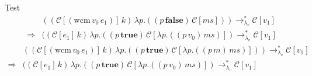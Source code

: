 \documentclass[ms,electronic,twosidetoc,letterpaper,chaptercenter,parttop]{byumsphd}
\begin{document}
\begin{theorem}

















\end{theorem}
\begin{theorem}
Test
\begin{align*}
            &((\mathcal{C}[(\mathrm{wcm}\,v_0\,e_1)]\,k)\,\lambda p.((p\,\mathbf{false})\,\mathcal{C}[\mathit{ms}]))\rightarrow_{\lambda_{v}}^{*}\mathcal{C}[v_1]\\
\Rightarrow &((\mathcal{C}[e_1]\,k)\,\lambda p.((p\,\mathbf{true})\,\mathcal{C}[\lambda p.((p\,v_0)\,\mathit{ms})])\rightarrow_{\lambda_{v}}^{*}\mathcal{C}[v_1]
\end{align*}
\begin{align*}
            &((\mathcal{C}[(\mathrm{wcm}\,v_0\,e_1)]\,k)\,\lambda p.((p\,\mathbf{true})\,\mathcal{C}[\lambda p.((p\,m)\,\mathit{ms})]))\rightarrow_{\lambda_{v}}^{*}\mathcal{C}[v_1]\\
\Rightarrow &((\mathcal{C}[e_1]\,k)\,\lambda p.((p\,\mathbf{true})\,\mathcal{C}[\lambda p.((p\,v_0)\,\mathit{ms})])\rightarrow_{\lambda_{v}}^{*}\mathcal{C}[v_1]
\end{align*}
\end{theorem}
\end{document}
